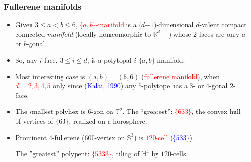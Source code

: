 \documentclass{beamer}
\newcommand{\RR}{\ensuremath{\mathbb{R}}}
\begin{document}
\begin{frame}\frametitle{Fullerene manifolds}
\vspace{-1mm}
\begin{itemize}
\item Given $3\le a<b\le 6$, \textcolor{red}{$\{a,b\}$-manifold} is a 
$(d$$-$$1)$-dimensional 
$d$-valent compact 
connected {\em manifold}
(locally homeomorphic   to $\RR^{d-1}$) whose
$2$-faces are  only $a$- or $b$-gonal.
\item
So, any $i$-face, $3\leq i\leq d$, is a polytopal $i$-$\{a,b\}$-manifold.
\item 
Most interesting case is $(a,b)=(5,6)$ (\textcolor{red}{fullerene manifold}), 
when \textcolor{red}{$d=2,3,4,5$} only since  
(\textcolor{blue}{Kalai, 1990}) 
any
$5$-polytope has a $3$- or $4$-gonal $2$-face.
\pause

\item 
The smallest polyhex is $6$-gon on  $\mathbb{T}^2$.
The ``greatest'': \textcolor{red}{$\{633\}$}, the convex hull of
vertices
of $\{63\}$, realized on a horosphere.

\item 
Prominent $4$-fullerene ($600$-vertex on $\mathbb{S}^3$) is   
\textcolor{red}{$120$-cell} 
(\textcolor{blue}{$\{533\}$}).

The ''greatest'' polypent: \textcolor{red}{$\{5333\}$}, tiling of
$\mathbb{H}^4$ by
$120$-cells.



\end{itemize}

\end{frame}





\end{document}
